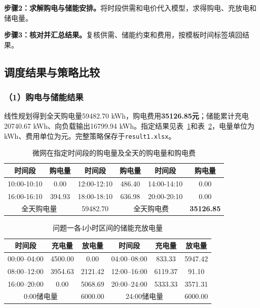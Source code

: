 \noindent\textbf{步骤2：求解购电与储能安排。}将时段供需和电价代入模型，求得购电、充放电和储电量。

\noindent\textbf{步骤3：核对并汇总结果。}复核供需、储能约束和费用，按模板时间标签填回结果。

\subsection{调度结果与策略比较}
\subsubsection*{（1）购电与储能结果}
线性规划得到全天购电量59482.70 kWh，购电费用\textbf{35126.85元}；储能累计充电20740.67 kWh、向负载输出16799.94 kWh。指定结果见表~\ref{tab:q1_purchase_result}和表~\ref{tab:q1_storage_result}，电量单位为kWh、费用单位为元。完整策略保存于\texttt{result1.xlsx}。

\begin{table}[!htbp]
    \centering
    \caption{微网在指定时间段的购电量及全天的购电量和购电费 }
    \label{tab:q1_purchase_result}
    \begin{tabular}{|c|c|c|c|c|c|}
        \hline
        时间段 & 购电量 & 时间段 & 购电量 & 时间段 & 购电量 \\
        \hline
        10:00-10:10 & 0.00 & 12:00-12:10 & 486.40 & 14:00-14:10 & 0.00 \\
        \hline
        16:00-16:10 & 394.93 & 18:00-18:10 & 636.98 & 20:00-20:10 & 0.00 \\
        \hline
        \multicolumn{2}{|c|}{全天购电量} & \multicolumn{1}{c|}{59482.70} & \multicolumn{2}{c|}{全天购电费} & \multicolumn{1}{c|}{\textbf{35126.85}}\\
        \hline
    \end{tabular}
\end{table}

\begin{table}[!htbp]
    \centering
    \caption{问题一各4小时区间的储能充放电量}
    \label{tab:q1_storage_result}
    \begin{tabular}{|c|c|c|c|c|c|}
        \hline
        时间段 & 充电量 & 放电量 & 时间段 & 充电量 & 放电量 \\
        \hline
        00:00--04:00 & 4500.00 & 0.00 & 04:00--08:00 & 833.33 & 5947.42 \\
        \hline
        08:00--12:00 & 3954.63 & 2121.42 & 12:00--16:00 & 6119.37 & 91.10 \\
        \hline
        16:00--20:00 & 0.00 & 5068.69 & 20:00--24:00 & 5333.33 & 3571.31 \\
        \hline
        \multicolumn{2}{|c|}{0:00储电量} & \multicolumn{1}{|c|}{6000.00} & \multicolumn{2}{c|}{24:00储电量} & \multicolumn{1}{c|}{6000.00}\\
        \hline
    \end{tabular}
\end{table}

